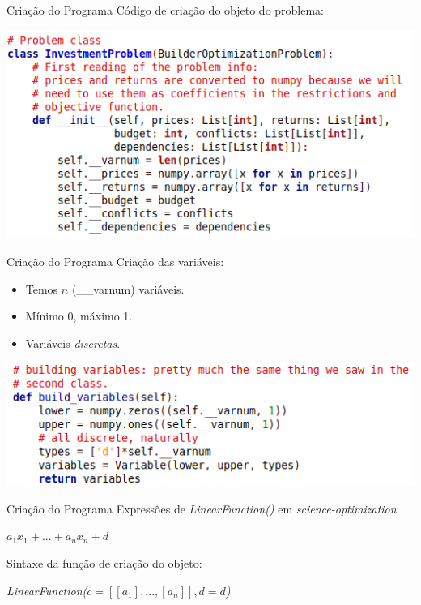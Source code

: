 \documentclass{beamer}
\begin{document}
\begin{frame}{Criação do Programa}
Código de criação do objeto do problema:\pause
\begin{center}
\includegraphics[scale=0.4]{OBJECT_CREATION_FOR_PRESENTATION.png}
\end{center}
\end{frame}

\begin{frame}{Criação do Programa}
Criação das variáveis:\pause
\begin{itemize}
\item Temos $n$ (\_\_varnum) variáveis.\pause
\item Mínimo 0, máximo 1.\pause
\item Variáveis \emph{discretas}.\pause
\end{itemize}
\begin{center}
\includegraphics[scale=0.4]{VARIABLES_FOR_PRESENTATION.png}
\end{center}
\end{frame}

\begin{frame}{Criação do Programa}
Expressões de \emph{LinearFunction()} em \emph{science-optimization}:\pause
\begin{center}
$a_1x_1+...+a_nx_n+d$
\end{center}\pause
Sintaxe da função de criação do objeto:\pause
\begin{center}
\emph{LinearFunction($c=[[a_1],...,[a_n]],d=d$)}
\end{center}
\end{frame}
\end{document}
